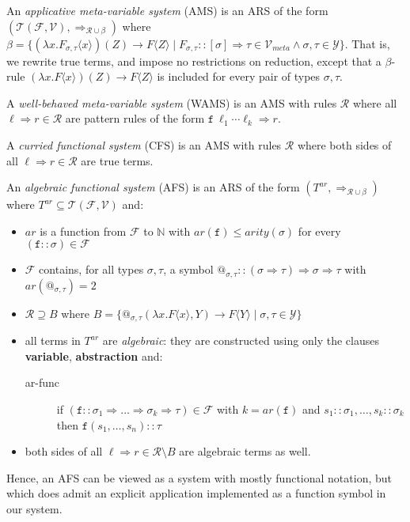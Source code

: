 \documentclass{lmcs}
\theoremstyle{theorem}\newtheorem{theorem}{Theorem}
\theoremstyle{theorem}\newtheorem{lemma}[theorem]{Lemma}
\theoremstyle{theorem}\newtheorem{corollary}[theorem]{Corollary}
\theoremstyle{definition}\newtheorem{definition}[theorem]{Definition}
\theoremstyle{definition}\newtheorem{example}[theorem]{Example}
\newcommand{\N}{\mathbb{N}}
\newcommand{\F}{\mathcal{F}}
\newcommand{\V}{\mathcal{V}}
\newcommand{\Vmeta}{\mathcal{V}_{\mathit{meta}}}
\newcommand{\Types}{\mathcal{Y}}
\newcommand{\Terms}{\mathcal{T}}
\newcommand{\Rules}{\mathcal{R}}
\newcommand{\atype}{\sigma}
\newcommand{\btype}{\tau}
\newcommand{\identifier}[1]{\mathtt{#1}}
\newcommand{\afun}{\identifier{f}}
\newcommand{\avar}{x}
\newcommand{\clause}[1]{\textbf{#1}}
\newcommand{\abs}[2]{\lambda #1.#2}
\newcommand{\meta}[2]{#1\langle#2\rangle}
\newcommand{\arity}{\mathit{ar}}
\newcommand{\arrtype}{\Rightarrow}
\newcommand{\arrz}{\Rightarrow}
\newcommand{\arr}[1]{\arrz_{#1}}
\begin{document}
An \emph{applicative meta-variable system} (AMS) is an ARS of the form
$(\Terms(\F,\V),\arr{\Rules \cup \beta})$ where $\beta =
\{ (\abs{\avar}{\meta{F_{\atype,\btype}}{\avar}})(Z) \to \meta{F}{Z} \mid F_{\atype,
\btype} :: [\atype] \arrtype \btype \in \Vmeta \wedge \atype,\btype \in \Types\}$.
That is, we rewrite true terms, and impose no restrictions on reduction, except that a
$\beta$-rule $(\abs{\avar}{\meta{F}{\avar}})(Z) \to \meta{F}{Z}$ is included for every pair of
types $\atype,\btype$.

A \emph{well-behaved meta-variable system} (WAMS) is an AMS with rules $\Rules$ where
all $\ell \arrz r \in \Rules$ are pattern rules of the form $\afun\ \ell_1 \cdots \ell_k \arrz r$.

A \emph{curried functional system} (CFS) is an AMS with rules $\Rules$ where both sides of all
$\ell \arrz r \in \Rules$ are true terms.

An \emph{algebraic functional system} (AFS) is an ARS of the form $(T^\arity,\arr{\Rules \cup
\beta})$ where $T^\arity \subseteq \Terms(\F,\V)$ and:
\begin{itemize}
\item $\arity$ is a function from $\F$ to $\N$ with $\arity(\afun) \leq \mathit{arity}(\atype)$
  for every $(\afun :: \atype) \in \F$
\item $\F$ contains, for all types $\atype,\btype$, a symbol $@_{\atype,\btype} :: (\atype
  \arrtype \btype) \arrtype \atype \arrtype \btype$ with $\arity(@_{\atype,\btype}) = 2$
\item $\Rules \supseteq B$ where $B = \{ @_{\atype,\btype}(\abs{\avar}{\meta{F}{\avar}},Y) \to
  \meta{F}{Y} \mid \atype,\btype \in \Types \}$
\item all terms in $T^\arity$ are \emph{algebraic}: they are constructed using only the clauses
  \clause{variable}, \clause{abstraction} and:
  \begin{description}
  \item[ar-func] if $(\afun :: \atype_1 \arrtype \dots \arrtype \atype_k \arrtype \btype) \in \F$
    with $k = \arity(\afun)$ and $s_1 :: \atype_1,\dots,s_k :: \atype_k$ then $\afun(s_1,\dots,
    s_n) :: \btype$
  \end{description}
\item both sides of all $\ell \arrz r \in \Rules \setminus B$ are algebraic terms as well.
\end{itemize}
Hence, an AFS can be viewed as a system with mostly functional notation, but which does admit an
explicit application implemented as a function symbol in our system.
\end{document}
